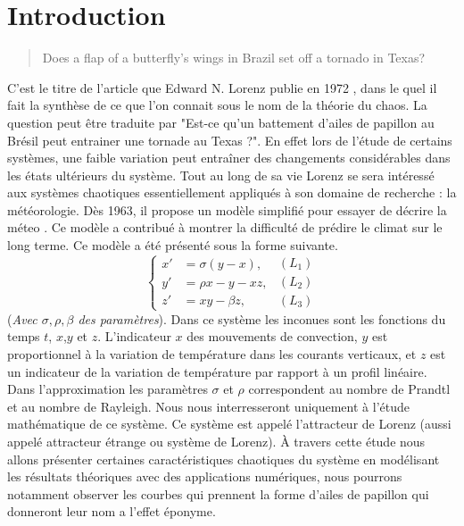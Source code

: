 \documentclass{article}
\newtheorem[M , nocut]{prop}{Proposition}[section]
\newtheorem[M , nocut]{definition}{Définition}
\newtheorem[M , nocut]{lemme}{Lemme}
\newtheorem[L , nocut]{thm}{Théoreme}
\newtheorem[M , nocut]{cor}{Corollaire}
\begin{document}
\section{Introduction}
\thispagestyle{empty}
\setcounter{page}{1}
\begin{quotation}
    Does a flap of a butterfly's wings in Brazil set off a tornado in Texas?
\end{quotation}
C'est le titre de l'article que Edward N. Lorenz publie en 1972 \cite{edward_lorenz_does_1972}, dans le quel il fait la synthèse de ce que l'on connait sous le nom de la théorie du chaos. La question peut être traduite par "Est-ce qu'un battement d'ailes de papillon au Brésil peut entrainer une tornade au Texas ?". En effet lors de l'étude de certains systèmes, une faible variation peut entraîner des changements considérables dans les états ultérieurs du système. Tout au long de sa vie Lorenz se sera intéressé aux systèmes chaotiques essentiellement appliqués à son domaine de recherche : la météorologie. Dès 1963, il propose un modèle simplifié pour essayer de décrire la méteo \cite{edward_n_lorenz_deterministic_1963}. Ce modèle a contribué à montrer la difficulté de prédire le climat sur le long terme. Ce modèle a été présenté sous la forme suivante.
\begin{equation}
    \label{Lorenz}
    \left\{
    \begin{array}{rl}
        x' &=\sigma(y-x), \\
        y' &=\rho x -y - xz,\\
        z' &=xy - \beta z,
    \end{array}
    \right.
    \begin{array}{r}
        (L_1)\\
        (L_2)\\
        (L_3)
    \end{array}
\end{equation}
(\textit{Avec $\sigma,\rho,\beta$ des paramètres}). Dans ce système les inconues sont les fonctions du temps $t$, $x$,$y$ et $z$. L'indicateur $x$ des mouvements de convection, $y$ est proportionnel à la variation de température dans les courants verticaux, et $z$ est un indicateur de la variation de température par rapport à un profil linéaire. Dans l'approximation les paramètres $\sigma$ et $\rho$ correspondent au nombre de Prandtl et au nombre de Rayleigh. Nous nous interresseront uniquement à l'étude mathématique de ce système. Ce système est appelé l'attracteur de Lorenz (aussi appelé attracteur étrange ou système de Lorenz). \`A travers cette étude nous allons présenter certaines caractéristiques chaotiques du système en modélisant les résultats théoriques avec des applications numériques, nous pourrons notamment observer les courbes qui prennent la forme d'ailes de papillon qui donneront leur nom a l'effet éponyme.
   
\end{document}
